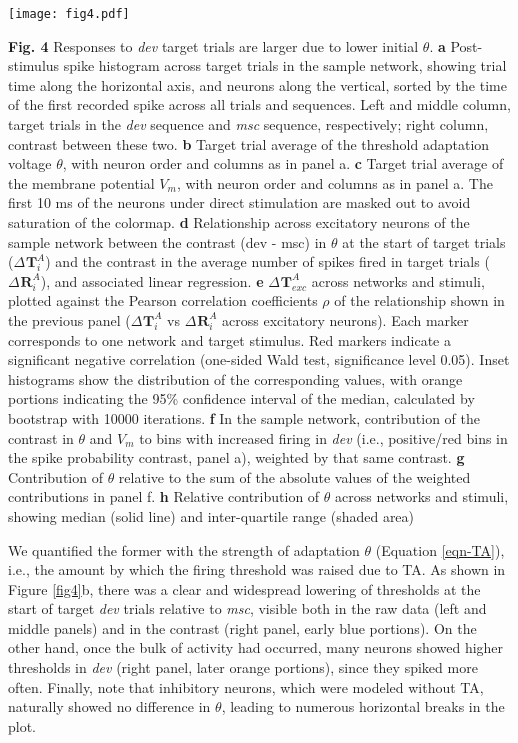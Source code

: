 \documentclass[pdflatex,referee,iicol,sn-basic]{sn-jnl}
\newcommand{\dev}{\textit{dev}}
\newcommand{\msc}{\textit{msc}}
\renewcommand{\R}[3][]{{}^{#1}_{}\mathbf{R}^{#2}_{#3}}
\renewcommand{\T}[3][]{{}^{#1}_{}\mathbf{T}^{#2}_{#3}}
\newcommand{\refpanel}[2]{Figure \ref{fig#1}\lowercase{#2}}
\begin{document}
\begin{figure*}%
    \centering
    \texttt{[image: fig4.pdf]}
    \caption{}
    \label{fig4}
\end{figure*}
\textbf{Fig. 4} Responses to \dev{} target trials are larger due to lower initial $\theta$.
\textbf{a} Post-stimulus spike histogram across target trials in the sample network, showing trial time along the horizontal axis, and neurons along the vertical, sorted by the time of the first recorded spike across all trials and sequences. Left and middle column, target trials in the \dev{} sequence and \msc{} sequence, respectively; right column, contrast between these two.
\textbf{b} Target trial average of the threshold adaptation voltage $\theta$, with neuron order and columns as in panel a.
\textbf{c} Target trial average of the membrane potential $V_m$, with neuron order and columns as in panel a. The first 10 ms of the neurons under direct stimulation are masked out to avoid saturation of the colormap.
\textbf{d} Relationship across excitatory neurons of the sample network between the contrast (dev - msc) in $\theta$ at the start of target trials ($\Delta \T{A}{i}$) and the contrast in the average number of spikes fired in target trials ($\Delta \R{A}{i}$), and associated linear regression.
\textbf{e} $\Delta \T{A}{exc}$ across networks and stimuli, plotted against the Pearson correlation coefficients $\rho$ of the relationship shown in the previous panel ($\Delta \T{A}{i}$ vs $\Delta \R{A}{i}$ across excitatory neurons). Each marker corresponds to one network and target stimulus. Red markers indicate a significant negative correlation (one-sided Wald test, significance level 0.05). Inset histograms show the distribution of the corresponding values, with orange portions indicating the 95\% confidence interval of the median, calculated by bootstrap with 10000 iterations.
\textbf{f} In the sample network, contribution of the contrast in $\theta$ and $V_m$ to bins with increased firing in \dev{} (i.e., positive/red bins in the spike probability contrast, panel a), weighted by that same contrast.
\textbf{g} Contribution of $\theta$ relative to the sum of the absolute values of the weighted contributions in panel f.
\textbf{h} Relative contribution of $\theta$ across networks and stimuli, showing median (solid line) and inter-quartile range (shaded area)

We quantified the former with the strength of adaptation $\theta$ (Equation \ref{eqn-TA}), i.e., the amount by which the firing threshold was raised due to TA. As shown in \refpanel{4}{b}, there was a clear and widespread lowering of thresholds at the start of target \dev{} trials relative to \msc{}, visible both in the raw data (left and middle panels) and in the contrast (right panel, early blue portions). On the other hand, once the bulk of activity had occurred, many neurons showed higher thresholds in \dev{} (right panel, later orange portions), since they spiked more often. Finally, note that inhibitory neurons, which were modeled without TA, naturally showed no difference in $\theta$, leading to numerous horizontal breaks in the plot.
\end{document}
